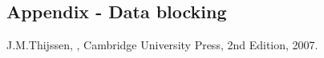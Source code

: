 \documentclass[twoside]{article}
\begin{document}
\begin{multicols}{2}
\begin{appendices}
\section{Appendix - Data blocking}

\end{appendices}


\begin{thebibliography}{99} %

J.M.Thijssen,
, Cambridge University Press, 2nd Edition, 2007.
\end{thebibliography}

\end{multicols}
\end{document}
